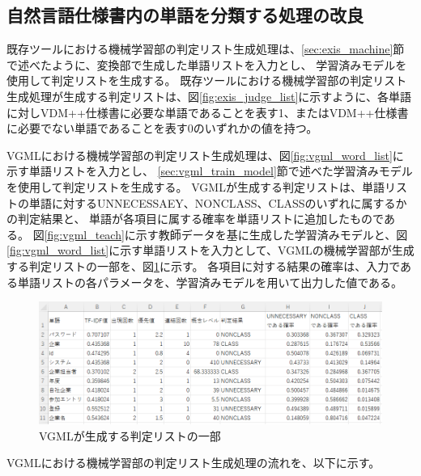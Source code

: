 \subsection{自然言語仕様書内の単語を分類する処理の改良}
既存ツールにおける機械学習部の判定リスト生成処理は、\ref{sec:exis_machine}節で述べたように、変換部で生成した単語リストを入力とし、
学習済みモデルを使用して判定リストを生成する。
既存ツールにおける機械学習部の判定リスト生成処理が生成する判定リストは、図\ref{fig:exis_judge_list}に示すように、各単語に対しVDM++仕様書に必要な単語であることを表す1、またはVDM++仕様書に必要でない単語であることを表す0のいずれかの値を持つ。

VGMLにおける機械学習部の判定リスト生成処理は、図\ref{fig:vgml_word_list}に示す単語リストを入力とし、
\ref{sec:vgml_train_model}節で述べた学習済みモデルを使用して判定リストを生成する。
VGMLが生成する判定リストは、単語リストの単語に対するUNNECESSAEY、NONCLASS、CLASSのいずれに属するかの判定結果と、
単語が各項目に属する確率を単語リストに追加したものである。
図\ref{fig:vgml_teach}に示す教師データを基に生成した学習済みモデルと、図\ref{fig:vgml_word_list}に示す単語リストを入力として、VGMLの機械学習部が生成する判定リストの一部を、図\ref{fig:vgml_judge_list}に示す。
各項目に対する結果の確率は、入力である単語リストの各パラメータを、学習済みモデルを用いて出力した値である。

\begin{figure}[t]
    \begin{center}
        \includegraphics[width=1.0\columnwidth]{image/vgml_judge_list.png}
        \caption{VGMLが生成する判定リストの一部}
        \label{fig:vgml_judge_list}
    \end{center}
\end{figure}

VGMLにおける機械学習部の判定リスト生成処理の流れを、以下に示す。

